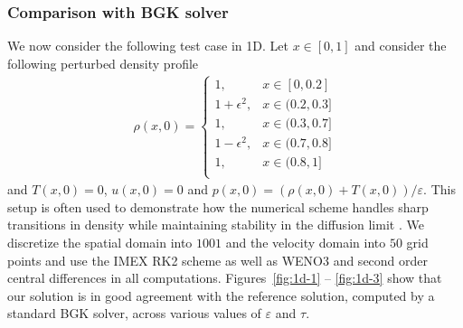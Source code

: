 \documentclass[final,11pt]{siamart251216}
\numberwithin{equation}{section}
\theoremstyle{definition}
\theoremstyle{remark}
\begin{document}
\subsubsection{Comparison with BGK solver}
We now consider the following test case in 1D. Let $x \in [0,1]$ and consider the following perturbed density profile
\begin{align}\label{InitialVelocity1}
	\rho(x,0) = \begin{cases} 1, & x \in [0,0.2] \\
							 1+\epsilon^2, & x \in (0.2,0.3] \\ 
							  1, & x \in (0.3,0.7] \\
							   1-\epsilon^2, & x \in (0.7,0.8] \\
							    1, & x \in (0.8,1] \\
							  \end{cases}
\end{align}
and $T(x,0) = 0$, $u(x,0) = 0$ and $p(x,0) = (\rho(x,0) + T(x,0))/\varepsilon$. This setup is often used to demonstrate how the numerical scheme handles sharp transitions in density while maintaining stability in the diffusion limit \cite{DegondTang2011,DimarcoLoubereVignal2017}. We discretize the spatial domain into $1001$ and the velocity domain into $50$ grid points and use the IMEX RK2 scheme as well as WENO3 and second order central differences in all computations. Figures~\eqref{fig:1d-1} -- \eqref{fig:1d-3} show that our solution is in good agreement with the reference solution, computed by a standard BGK solver, across various values of $\varepsilon$ and $\tau$.
\end{document}
